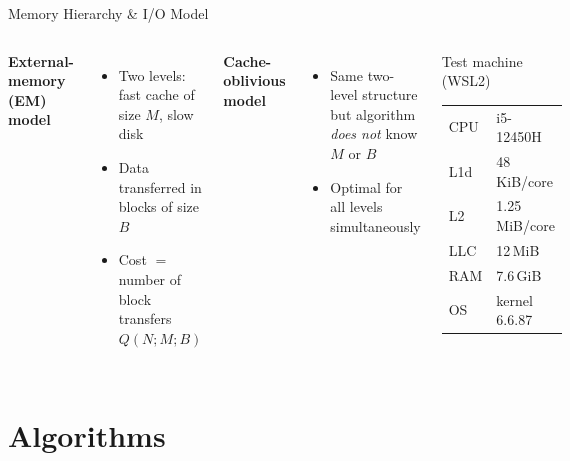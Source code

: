 \documentclass[aspectratio=169]{beamer}
\begin{document}
\begin{frame}{Memory Hierarchy \& I/O Model}
  \begin{columns}
      \textbf{External-memory (EM) model}
      \begin{itemize}
        \item Two levels: fast cache of size $M$, slow disk
        \item Data transferred in blocks of size $B$
        \item Cost $=$ number of block transfers $Q(N;M;B)$
      \end{itemize}
      \vspace{0.5em}
      \textbf{Cache-oblivious model}
      \begin{itemize}
        \item Same two-level structure but algorithm \emph{does not}
              know $M$ or $B$
        \item Optimal for all levels simultaneously
      \end{itemize}
      \begin{block}{Test machine (WSL2)}
        \begin{tabular}{ll}
          CPU & i5-12450H \\
          L1d & 48\,KiB/core \\
          L2  & 1.25\,MiB/core \\
          LLC & 12\,MiB \\
          RAM & 7.6\,GiB \\
          OS  & kernel 6.6.87 \\
        \end{tabular}
      \end{block}
  \end{columns}
\end{frame}

\section{Algorithms}
\end{document}
